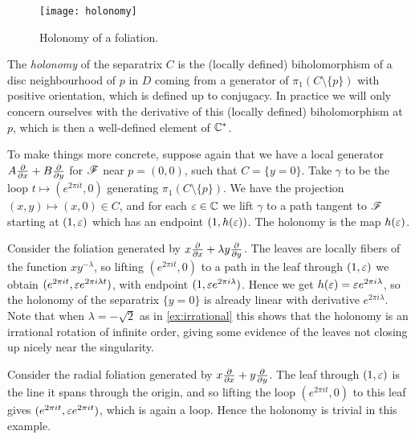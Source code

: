 \begin{figure}[H]
    \centering
    \texttt{[image: holonomy]}
    \caption{Holonomy of a foliation.}
\end{figure}

\begin{definition}
    The \emph{holonomy} of the separatrix $C$ is the (locally defined)
    biholomorphism of a disc neighbourhood of $p$ in $D$ coming from a generator
    of $\pi_1(C\setminus\{p\})$ with positive orientation, which is defined up
    to conjugacy. In practice we will only concern ourselves with the derivative
    of this (locally defined) biholomorphism at $p$, which is then a
    well-defined element of $\mathbb{C}^*$.
\end{definition}

To make things more concrete, suppose again that we have a local generator
$A\pdv{}{x}+B\pdv{}{y}$ for $\mathscr{F}$ near $p=(0,0)$, such that $C=\{y=0\}$. Take
$\gamma$ to be the loop $t\mapsto(e^{2\pi it},0)$ generating
$\pi_1(C\setminus\{p\})$. We have the projection $(x,y)\mapsto(x,0)\in C$, and
for each $\varepsilon\in\mathbb{C}$ we lift $\gamma$ to a path tangent to $\mathscr{F}$ starting at
$(1,\varepsilon)$ which has an endpoint $(1,h(\varepsilon))$. The holonomy is the map
$h(\varepsilon)$.

\begin{example}
    Consider the foliation generated by $x\pdv{}{x}+\lambda y\pdv{}{y}$. The
    leaves are locally fibers of the function $xy^{-\lambda}$, so lifting
    $(e^{2\pi it},0)$ to a path in the leaf through $(1,\varepsilon)$ we obtain
    $(e^{2\pi it},\varepsilon e^{2\pi i\lambda t})$, with endpoint
    $(1,\varepsilon e^{2\pi i\lambda})$. Hence we get
    $h(\varepsilon)=\varepsilon e^{2\pi i\lambda}$, so the holonomy of the separatrix
    $\{y=0\}$ is already linear with derivative $e^{2\pi i\lambda}$. Note that
    when $\lambda=-\sqrt2$ as in \cref{ex:irrational} this shows that the
    holonomy is an irrational rotation of infinite order, giving some evidence
    of the leaves not closing up nicely near the singularity.
\end{example}

\begin{example}\label{ex:radial holonomy}
    Consider the radial foliation generated by $x\pdv{}{x}+y\pdv{}{y}$. The leaf
    through $(1,\varepsilon)$ is the line it spans through the origin, and so lifting
    the loop $(e^{2\pi it},0)$ to this leaf gives
    $(e^{2\pi it},\varepsilon e^{2\pi it})$, which is again a loop. Hence the holonomy
    is trivial in this example.
\end{example}

